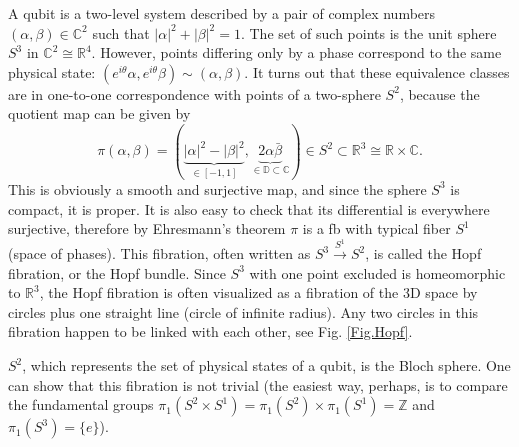 \documentclass[english,letterpaper]{article}%
\numberwithin{equation}{section}
\numberwithin{figure}{section}
\numberwithin{table}{section}
\theoremstyle{definition}
\theoremstyle{definition}
\theoremstyle{definition}
\theoremstyle{plain}
\theoremstyle{plain}
\theoremstyle{plain}
\theoremstyle{plain}
\theoremstyle{remark}
\theoremstyle{remark}
\begin{document}
\begin{example}\label{Hopf bundle}
A qubit is a two-level system described by a pair of complex numbers $(\alpha,\beta)\in\mathbb{C}^2$ such that $|\alpha|^2+|\beta|^2=1$. The set of such points is the unit sphere $S^3$ in $\mathbb{C}^2\cong\mathbb{R}^4$. However, points differing only by a phase correspond to the same physical state: $(e^{i\theta}\alpha,e^{i\theta}\beta)\sim(\alpha,\beta)$. It turns out that these equivalence classes are in one-to-one correspondence with points of a two-sphere $S^2$, because the quotient map can be given by
\[\pi(\alpha,\beta)=(\underbrace{|\alpha|^2-|\beta|^2}_{\in [-1,1]},\underbrace{2\alpha\bar\beta}_{\in \mathbb{D}\subset\mathbb{C}})\in S^2\subset\mathbb{R}^3\cong \mathbb{R}\times\mathbb{C}.\]
This is obviously a smooth and surjective map, and since the sphere $S^3$ is compact, it is proper. It is also easy to check that its differential is everywhere surjective, therefore by Ehresmann's theorem $\pi$ is a \gls{fb} with typical fiber $S^1$ (space of phases). This fibration, often written as $S^3\overset{S^1}{\to}S^2$, is called the Hopf fibration, or the Hopf bundle. Since $S^3$ with one point excluded is homeomorphic to $\mathbb{R}^3$, the Hopf fibration is often visualized as a fibration of the 3D space by circles plus one straight line (circle of infinite radius). Any two circles in this fibration happen to be linked with each other, see Fig. \ref{Fig.Hopf}.

$S^2$, which represents the set of physical states of a qubit, is the Bloch sphere. One can show that this fibration is not trivial (the easiest way, perhaps, is to compare the fundamental groups $\pi_1(S^2\times S^1)=\pi_1(S^2)\times\pi_1(S^1)=\mathbb{Z}$ and $\pi_1(S^3)=\{e\}$).


\end{example}
\end{document}
